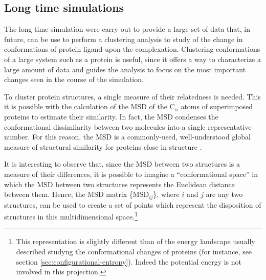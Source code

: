 \subsection{Long time simulations}
The long time simulation were carry out to provide a large set of data that, in future, can be use to perform a clustering analysis to study of the change in conformations of protein ligand upon the complexation. Clustering conformations of a large system such as a protein is useful, since it offers a way to characterize a large amount of data and guides the analysis to focus on the most important changes seen in the course of the simulation. %

To cluster protein structures, a single measure of their relatedness is needed. This it is possible with the calculation of the MSD of the C$_\alpha$ atoms of superimposed proteins to estimate their similarity. In fact, the MSD condenses the conformational dissimilarity between two molecules into a single representative number. For this reason, the MSD is a commonly-used, well-understood global measure of structural similarity for proteins close in structure \cite{troyer1995protein}.

It is interesting to observe that, since the MSD between two structures is a measure of their differences, it is possible to imagine a ``conformational space'' in which the MSD between two structures represents the Euclidean distance between them. Hence, the MSD matrix \{MSD$_{ij}$\}, where $i$ and $j$ are any two structures, can be used to create a set of points which represent the disposition of structures in this multidimensional space.\footnote{This representation is slightly different than of the energy landscape usually described studyng the conformational changes of proteins (for instance, see section \ref{sec:configurational-entropy}). Indeed the potential energy is not involved in this projection.}
 

